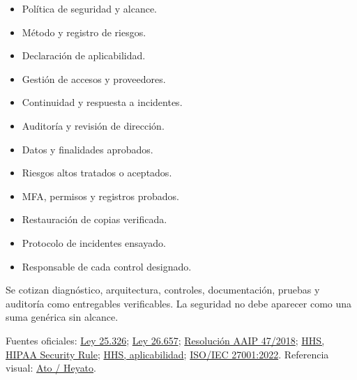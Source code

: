 \documentclass[11pt,a4paper]{article}
\begin{document}
\vspace{3mm}
\begin{minipage}[t]{.48\textwidth}
    \begin{softcard}[height=47mm,top=2.5mm,bottom=2.5mm,fontupper=\footnotesize]
    \begin{itemize}
      \item Política de seguridad y alcance.
      \item Método y registro de riesgos.
      \item Declaración de aplicabilidad.
      \item Gestión de accesos y proveedores.
      \item Continuidad y respuesta a incidentes.
      \item Auditoría y revisión de dirección.
    \end{itemize}
  \end{softcard}
\end{minipage}\hfill
\begin{minipage}[t]{.48\textwidth}
    \begin{softcard}[height=47mm,top=2.5mm,bottom=2.5mm,fontupper=\footnotesize]
    \begin{itemize}
      \item Datos y finalidades aprobados.
      \item Riesgos altos tratados o aceptados.
      \item MFA, permisos y registros probados.
      \item Restauración de copias verificada.
      \item Protocolo de incidentes ensayado.
      \item Responsable de cada control designado.
    \end{itemize}
  \end{softcard}
\end{minipage}

\vspace{3mm}
\begin{navycard}[top=4mm,bottom=4mm]
  Se cotizan diagnóstico, arquitectura, controles, documentación, pruebas y auditoría como entregables verificables. La seguridad no debe aparecer como una suma genérica sin alcance.
\end{navycard}

\vspace{2mm}
{\scriptsize\color{Muted}
Fuentes oficiales: \href{https://www.argentina.gob.ar/normativa/nacional/ley-25326-2000-64790}{Ley 25.326};
\href{https://www.argentina.gob.ar/normativa/nacional/ley-26657-175977/texto}{Ley 26.657};
\href{https://www.argentina.gob.ar/normativa/nacional/resoluci%C3%B3n-47-2018-312662/texto}{Resolución AAIP 47/2018};
\href{https://www.hhs.gov/hipaa/for-professionals/security/laws-regulations/index.html}{HHS, HIPAA Security Rule};
\href{https://www.hhs.gov/hipaa/for-professionals/covered-entities/index.html}{HHS, aplicabilidad};
\href{https://www.iso.org/standard/27001}{ISO/IEC 27001:2022}. Referencia visual: \href{https://heyato.ai/}{Ato / Heyato}.\par}
\end{document}
